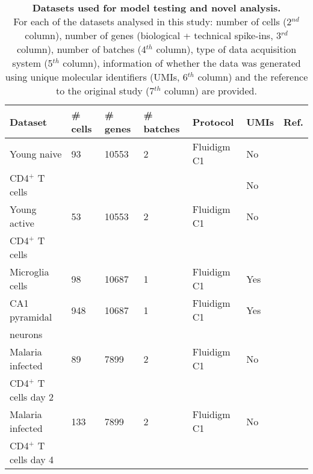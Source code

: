 \begin{table}[hb	]
\centering
\caption[Datasets used for model testing and novel analysis]{\textbf{Datasets used for model testing and novel analysis.} \\
For each of the datasets analysed in this study: number of cells (2$^{nd}$ column), number of genes (biological + technical spike-ins, 3$^{rd}$ column), number of batches (4$^{th}$ column), type of data acquisition system (5$^{th}$ column), information of whether the data was generated using unique molecular identifiers (UMIs, 6$^{th}$ column) and the reference to the original study (7$^{th}$ column) are provided.}
\label{table:effects_noise}
\begin{tabular}{lllllll}
\toprule
\textbf{Dataset} & \textbf{\# cells} & \textbf{\# genes} & \textbf{\# batches} & \textbf{Protocol} & \textbf{UMIs} & \textbf{Ref.}                       \\
\midrule
Young naive  & 93       & 10553    & 2          & Fluidigm C1       & No   & \citep{Martinez-jimenez2017} \\
CD4$^+$ T cells   &        &   &          &       & No   &  \\
\midrule

Young active    & 53       & 10553    & 2          & Fluidigm C1       & No   & \citep{Martinez-jimenez2017} \\
CD4$^+$ T cells    &        &     &           &        &    &  \\
\midrule

Microglia cells                         & 98       & 10687    & 1          & Fluidigm C1       & Yes  & \citep{Zeisel2015}           \\
\midrule

CA1 pyramidal                    & 948      & 10687    & 1          & Fluidigm C1       & Yes  & \citep{Zeisel2015}           \\
neurons       &       &     &           &       &   &           \\
\midrule

Malaria infected     & 89       & 7899     & 2          & Fluidigm C1       & No   & \citep{Lonnberg2017}         \\
CD4$^+$ T cells day 2     &        &      &          &  &    &  \\
\midrule

Malaria infected  & 133      & 7899     & 2          & Fluidigm C1       & No   & \citep{Lonnberg2017}         \\
CD4$^+$ T cells day 4     &       &      &    &  &    &\\
\midrule


\end{tabular}
\end{table}
